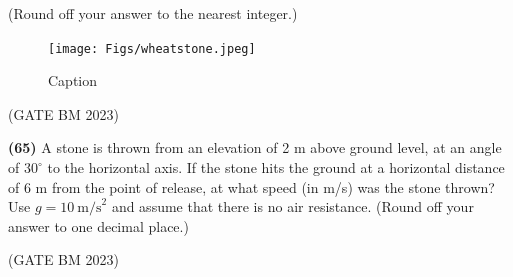 \documentclass[journal]{IEEEtran}
\numberwithin{equation}{enumi}
\numberwithin{figure}{enumi}
\begin{document}
(Round off your answer to the nearest integer.)
\begin{figure}[H]
    \centering
    \texttt{[image: Figs/wheatstone.jpeg]} 
    \caption{Caption}
    \label{fig:placeholder}
\end{figure}
\hfill (GATE BM 2023)

\textbf{(65)}
A stone is thrown from an elevation of 2 m above ground level, at an angle of \(30^\circ\) to the horizontal axis. If the stone hits the ground at a horizontal distance of 6 m from the point of release, at what speed (in m/s) was the stone thrown? Use \(g = 10~\text{m/s}^2\) and assume that there is no air resistance. (Round off your answer to one decimal place.)


\hfill (GATE BM 2023)
\end{document}
